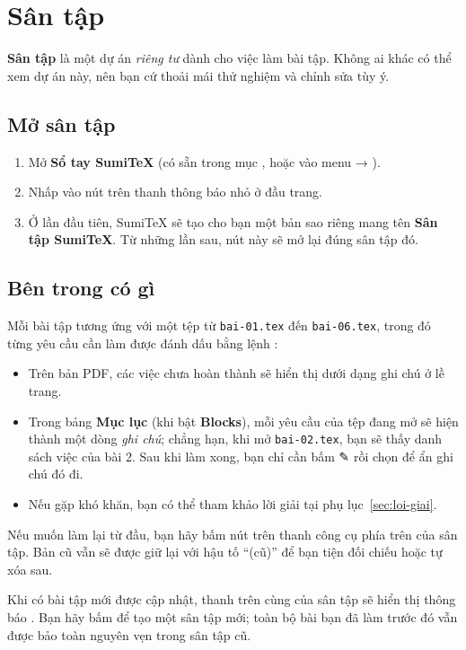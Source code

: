 \section{Sân tập}
\label{sec:san-tap}

\textbf{Sân tập} là một dự án \emph{riêng tư} dành cho việc làm bài tập. Không
ai khác có thể xem dự án này, nên bạn cứ thoải mái thử nghiệm và chỉnh sửa tùy
ý.

\subsection{Mở sân tập}
\begin{enumerate}
  \item Mở \textbf{Sổ tay SumiTeX} (có sẵn trong mục ,
    hoặc vào menu  → ).
  \item Nhấp vào nút  trên thanh thông báo nhỏ ở đầu
    trang.
  \item Ở lần đầu tiên, SumiTeX sẽ tạo cho bạn một bản sao riêng mang tên
    \textbf{Sân tập SumiTeX}. Từ những lần sau, nút này sẽ mở lại đúng sân tập
    đó.
\end{enumerate}

\subsection{Bên trong có gì}
Mỗi bài tập tương ứng với một tệp từ \texttt{bai-01.tex} đến
\texttt{bai-06.tex}, trong đó từng yêu cầu cần làm được đánh dấu bằng lệnh
:
\begin{itemize}
  \item Trên bản PDF, các việc chưa hoàn thành sẽ hiển thị dưới dạng ghi chú ở
    lề trang.
  \item Trong bảng \textbf{Mục lục} (khi bật \textbf{Blocks}), mỗi yêu cầu của
    tệp đang mở sẽ hiện thành một dòng \emph{ghi chú}; chẳng hạn, khi mở
    \texttt{bai-02.tex}, bạn sẽ thấy danh sách việc của bài 2. Sau khi làm
    xong, bạn chỉ cần bấm ✎ rồi chọn  để ẩn ghi chú đó đi.
  \item Nếu gặp khó khăn, bạn có thể tham khảo lời giải tại
    phụ lục~\ref{sec:loi-giai}.
\end{itemize}

\begin{meo}
Nếu muốn làm lại từ đầu, bạn hãy bấm nút  trên thanh công cụ
phía trên của sân tập. Bản cũ vẫn sẽ được giữ lại với hậu tố ``(cũ)'' để bạn
tiện đối chiếu hoặc tự xóa sau.
\end{meo}

\begin{chuy}
Khi có bài tập mới được cập nhật, thanh trên cùng của sân tập sẽ hiển thị thông
báo . Bạn hãy bấm  để
tạo một sân tập mới; toàn bộ bài bạn đã làm trước đó vẫn được bảo toàn nguyên
vẹn trong sân tập cũ.
\end{chuy}